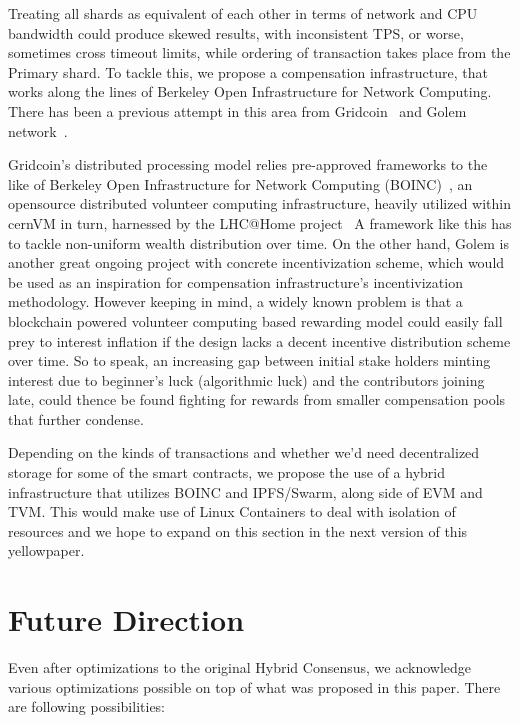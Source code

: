 \documentclass[9pt,oneside]{amsart}
\begin{document}
\begin{multicols}{2}
Treating all shards as equivalent of each other in terms of network and CPU bandwidth could produce skewed results,
with inconsistent TPS, or worse, sometimes cross timeout limits, while ordering of transaction takes place from the
Primary shard. To tackle this, we propose a compensation infrastructure, that works along the lines of Berkeley Open
Infrastructure for Network Computing. There has been a previous attempt in this area from Gridcoin~\cite{gridwhitepaper}
and Golem network~\cite{golemwhitepaper}.

Gridcoin's distributed processing model relies pre-approved frameworks to the like of Berkeley Open Infrastructure
for Network Computing (BOINC)~\cite{boincproject}, an opensource distributed volunteer computing infrastructure,
heavily utilized within cernVM\cite{cernvm} in turn, harnessed by the LHC@Home project~\cite{lhcathome}
A framework like this has to tackle non-uniform wealth distribution over time. On the other hand, Golem is another great
ongoing project with concrete incentivization scheme, which would be used as an inspiration for compensation infrastructure's
incentivization methodology. However keeping in mind, a widely known problem is that a blockchain powered volunteer computing
based rewarding model could easily fall prey to interest inflation if the design lacks a decent incentive distribution scheme over time.
So to speak, an increasing gap between initial stake holders minting interest due to beginner's luck (algorithmic luck) and the contributors
joining late, could thence be found fighting for rewards from smaller compensation pools that further condense.

Depending on the kinds of transactions and whether we'd need decentralized storage for some of the smart contracts, we propose the use of
a hybrid infrastructure that utilizes BOINC and IPFS/Swarm, along side of EVM and TVM. This would make use of Linux Containers to deal with
isolation of resources and we hope to expand on this section in the next version of this yellowpaper.

\section{Future Direction}

Even after optimizations to the original Hybrid Consensus, we acknowledge various optimizations possible on top of what was
proposed in this paper. There are following possibilities:


\end{multicols}
\end{document}
